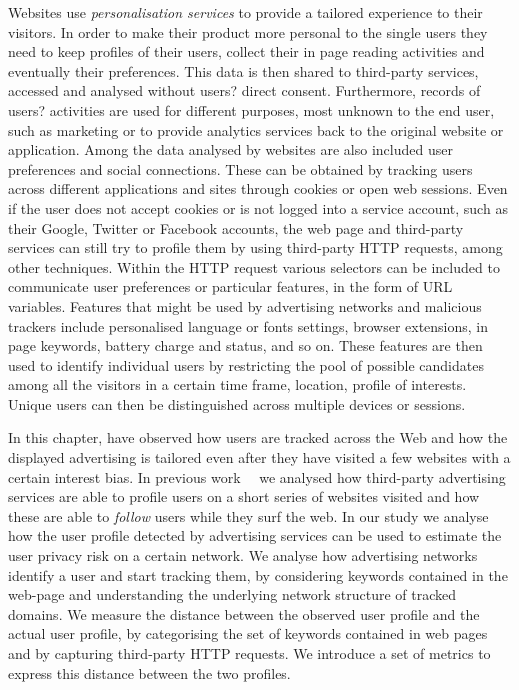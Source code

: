 Websites use \emph{personalisation services} to provide a tailored experience to their visitors. In order to make their product more personal to the single users they need to keep profiles of their users, collect their in page reading activities and eventually their preferences. This data is then shared to third-party services, accessed and analysed without users? direct consent. Furthermore, records of users? activities are used for different purposes, most unknown to the end user, such as marketing or to provide analytics services back to the original website or application.
Among the data analysed by websites are also included user preferences and social connections. These can be obtained by tracking users across different applications and sites through cookies or open web sessions. Even if the user does not accept cookies or is not logged into a service account, such as their Google, Twitter or Facebook accounts, the web page and third-party services can still try to profile them by using third-party HTTP requests, among other techniques. Within the HTTP request various selectors can be included to communicate user preferences or particular features, in the form of URL variables. Features that might be used by advertising networks and malicious trackers include personalised language or fonts settings, browser extensions, in page keywords, battery charge and status, and so on. These features are then used to identify individual users by restricting the pool of possible candidates among all the visitors in a certain time frame, location, profile of interests. Unique users can then be distinguished across multiple devices or sessions.

In this chapter, have observed how users are tracked across the Web and how the displayed advertising is tailored even after they have visited a few websites with a certain interest bias. In previous work~\cite{puglisi2016web}~\cite{puglisi2015you} we analysed how third-party advertising services are able to profile users on a short series of websites visited and how these are able to \emph{follow} users while they surf the web.
In our study we analyse how the user profile detected by advertising services can be used to estimate the user privacy risk on a certain network. We analyse how advertising networks identify a user and start tracking them, by considering keywords contained in the web-page and understanding the underlying network structure of tracked domains. We measure the distance between the observed user profile and the actual user profile, by categorising the set of keywords contained in web pages and by capturing third-party HTTP requests. We introduce a set of metrics to express this distance between the two profiles. 

